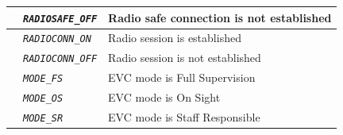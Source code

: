 \documentclass{template/openetcs}
\begin{document}
\begin{itemize}
\begin{longtable}{|l|l|l|}
			\hline

			&	\begin{minipage}[t]{0.40\linewidth} \emph{\texttt{RADIOSAFE\_OFF}} \end{minipage}
			&	\begin{minipage}[t]{0.38\linewidth} Radio safe connection is not established \end{minipage} \\ 

			\hline

			&	\begin{minipage}[t]{0.40\linewidth} \emph{\texttt{RADIOCONN\_ON}} \end{minipage}
			&	\begin{minipage}[t]{0.38\linewidth} Radio session is established \end{minipage} \\ 

			\hline

			&	\begin{minipage}[t]{0.40\linewidth} \emph{\texttt{RADIOCONN\_OFF}} \end{minipage}
			&	\begin{minipage}[t]{0.38\linewidth} Radio session is not established \end{minipage} \\ 

			\hline

			&	\begin{minipage}[t]{0.40\linewidth} \emph{\texttt{MODE\_FS}} \end{minipage}
			&	\begin{minipage}[t]{0.38\linewidth} EVC mode is Full Supervision \end{minipage} \\ 

			\hline

			&	\begin{minipage}[t]{0.40\linewidth} \emph{\texttt{MODE\_OS}} \end{minipage}
			&	\begin{minipage}[t]{0.38\linewidth} EVC mode is On Sight \end{minipage} \\ 

			\hline

			&	\begin{minipage}[t]{0.40\linewidth} \emph{\texttt{MODE\_SR}} \end{minipage}
			&	\begin{minipage}[t]{0.38\linewidth} EVC mode is Staff Responsible \end{minipage} \\ 


\end{longtable}
\end{itemize}
\end{document}
